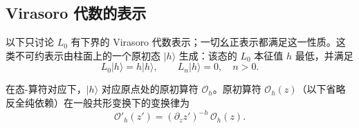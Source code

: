 
\subsection{Virasoro 代数的表示}

以下只讨论 $L_0$ 有下界的 Virasoro 代数表示；一切幺正表示都满足这一性质。这类不可约表示由柱面上的一个原初态 $|h\rangle$ 生成：该态的 $L_0$ 本征值 $h$ 最低，并满足
\begin{equation}
  \label{eq:2-12}
  L_0|h\rangle = h|h\rangle,\qquad L_n|h\rangle = 0,\quad n>0.
\end{equation}

在态-算符对应下，$|h\rangle$ 对应原点处的原初算符 $\mathcal{O}_h$。原初算符 $\mathcal{O}_h(z)$（以下省略反全纯依赖）在一般共形变换下的变换律为
\begin{equation}
  \label{eq:2-13}
  \mathcal{O}'_h(z') = (\partial_z z')^{-h}\,\mathcal{O}_h(z).
\end{equation}

